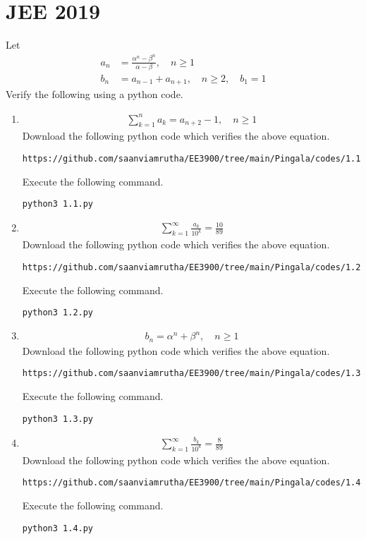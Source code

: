 \documentclass[journal,12pt,twocolumn]{IEEEtran}
\renewcommand\thesection{\arabic{section}}
\begin{document}
\section{JEE 2019}
Let 
\begin{align}
	a_n &= \frac{\alpha^{n}-\beta^{n}}{\alpha - \beta}, \quad n \ge 1
	\\
	b_n &= a_{n-1} + a_{n+1}, \quad n \ge 2, \quad b_1 =1
	\label{eq:10-orig-diff}
\end{align}
Verify the following using a python code.
\begin{enumerate}[label=\thesection.\arabic*
,ref=\thesection.\theenumi]
\item 
\begin{align}
	\sum_{k=1}^{n}a_k = a_{n+2}-1, \quad n \ge 1
\end{align}
\solution Download the following python code which verifies the above equation.
\begin{lstlisting}
https://github.com/saanviamrutha/EE3900/tree/main/Pingala/codes/1.1.py
\end{lstlisting}
Execute the following command.
\begin{lstlisting}
python3 1.1.py
\end{lstlisting}
 \item 
\begin{align}
	\sum_{k=1}^{\infty}\frac{a_k}{10^k} =\frac{10}{89}
\end{align}
\solution Download the following python code which verifies the above equation.
\begin{lstlisting}
https://github.com/saanviamrutha/EE3900/tree/main/Pingala/codes/1.2.py
\end{lstlisting}
Execute the following command.
\begin{lstlisting}
python3 1.2.py
\end{lstlisting}
 \item 
\begin{align}
	b_n =\alpha^n + \beta^n, \quad n \ge 1
\end{align}
\solution Download the following python code which verifies the above equation.
\begin{lstlisting}
https://github.com/saanviamrutha/EE3900/tree/main/Pingala/codes/1.3.py
\end{lstlisting}
Execute the following command.
\begin{lstlisting}
python3 1.3.py
\end{lstlisting}
 \item 
\begin{align}
	\sum_{k=1}^{\infty}\frac{b_k}{10^k} =\frac{8}{89}
\end{align}
\solution Download the following python code which verifies the above equation.
\begin{lstlisting}
https://github.com/saanviamrutha/EE3900/tree/main/Pingala/codes/1.4.py
\end{lstlisting}
Execute the following command.
\begin{lstlisting}
python3 1.4.py
\end{lstlisting}
\end{enumerate}
\end{document}
